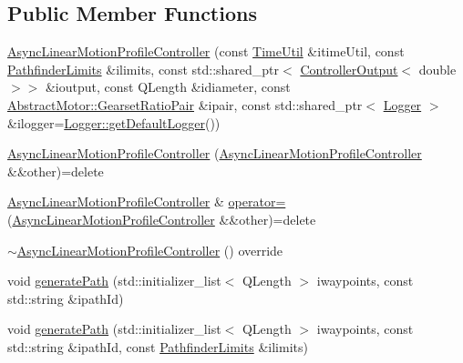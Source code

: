 \subsection*{Public Member Functions}
\begin{DoxyCompactItemize}
\item 
\mbox{\hyperlink{classokapi_1_1AsyncLinearMotionProfileController_a6a5c233fef5c310eaac306467e6a402b}{Async\+Linear\+Motion\+Profile\+Controller}} (const \mbox{\hyperlink{classokapi_1_1TimeUtil}{Time\+Util}} \&itime\+Util, const \mbox{\hyperlink{structokapi_1_1PathfinderLimits}{Pathfinder\+Limits}} \&ilimits, const std\+::shared\+\_\+ptr$<$ \mbox{\hyperlink{classokapi_1_1ControllerOutput}{Controller\+Output}}$<$ double $>$$>$ \&ioutput, const Q\+Length \&idiameter, const \mbox{\hyperlink{structokapi_1_1AbstractMotor_1_1GearsetRatioPair}{Abstract\+Motor\+::\+Gearset\+Ratio\+Pair}} \&ipair, const std\+::shared\+\_\+ptr$<$ \mbox{\hyperlink{classokapi_1_1Logger}{Logger}} $>$ \&ilogger=\mbox{\hyperlink{classokapi_1_1Logger_a5053cf778b4b55acba788a3797dc96d2}{Logger\+::get\+Default\+Logger}}())
\item 
\mbox{\hyperlink{classokapi_1_1AsyncLinearMotionProfileController_a9d12f6da129f5c8f8c2c6ddad12274bf}{Async\+Linear\+Motion\+Profile\+Controller}} (\mbox{\hyperlink{classokapi_1_1AsyncLinearMotionProfileController}{Async\+Linear\+Motion\+Profile\+Controller}} \&\&other)=delete
\item 
\mbox{\hyperlink{classokapi_1_1AsyncLinearMotionProfileController}{Async\+Linear\+Motion\+Profile\+Controller}} \& \mbox{\hyperlink{classokapi_1_1AsyncLinearMotionProfileController_a27f16841fdb3586adaf978da580e4f31}{operator=}} (\mbox{\hyperlink{classokapi_1_1AsyncLinearMotionProfileController}{Async\+Linear\+Motion\+Profile\+Controller}} \&\&other)=delete
\item 
\mbox{\hyperlink{classokapi_1_1AsyncLinearMotionProfileController_aaf6806399023d0a4d7dd0ae1a64b3470}{$\sim$\+Async\+Linear\+Motion\+Profile\+Controller}} () override
\item 
void \mbox{\hyperlink{classokapi_1_1AsyncLinearMotionProfileController_aef2acba51417d929695ca38e309b0f6c}{generate\+Path}} (std\+::initializer\+\_\+list$<$ Q\+Length $>$ iwaypoints, const std\+::string \&ipath\+Id)
\item 
void \mbox{\hyperlink{classokapi_1_1AsyncLinearMotionProfileController_ada94ccc2679082ea7fb2317458ca80d1}{generate\+Path}} (std\+::initializer\+\_\+list$<$ Q\+Length $>$ iwaypoints, const std\+::string \&ipath\+Id, const \mbox{\hyperlink{structokapi_1_1PathfinderLimits}{Pathfinder\+Limits}} \&ilimits)
$$
\end{DoxyCompactItemize}
